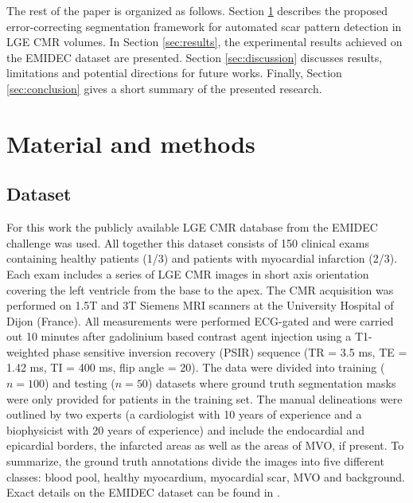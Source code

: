\documentclass[preprint,5p,authoryear]{elsarticle}
\begin{document}
The rest of the paper is organized as follows. Section \ref{sec:material} describes
the proposed error-correcting segmentation framework for automated scar pattern detection in LGE CMR volumes. In Section \ref{sec:results}, the experimental results achieved on the EMIDEC dataset are presented. Section \ref{sec:discussion} discusses results, limitations and potential directions for future works. Finally, Section \ref{sec:conclusion} gives a short summary of the presented research.  

\section{Material and methods}
\label{sec:material}

\subsection{Dataset}
For this work the publicly available LGE CMR database from the EMIDEC challenge \citep{lalande2022deep} was used. All together this dataset consists of 150 clinical exams containing healthy patients (1/3) and patients with myocardial infarction (2/3). Each exam includes a series of LGE CMR images in short axis orientation covering the left ventricle from the base to the apex. The CMR acquisition was performed on 1.5T and 3T Siemens MRI scanners at the University Hospital of Dijon (France). All measurements were performed ECG-gated and were carried out 10 minutes after gadolinium based contrast agent injection using a T1-weighted phase sensitive inversion recovery (PSIR) sequence (TR = 3.5 ms, TE = 1.42 ms, TI = 400 ms, flip angle = 20). The data were divided into training ($n=100$) and testing ($n=50$) datasets where ground truth segmentation masks were only provided for patients in the training set. The manual delineations were outlined by two experts (a cardiologist with 10 years of experience and a biophysicist with 20 years of experience) and include the endocardial and epicardial borders, the infarcted areas as well as the areas of MVO, if present. To summarize, the ground truth annotations divide the images into five different classes: blood pool, healthy myocardium, myocardial scar, MVO and background. Exact details on the EMIDEC dataset can be found in \cite{eimdec_dataset}.  
\end{document}
